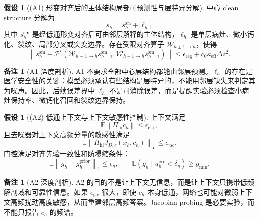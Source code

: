 \documentclass[11pt,a4paper,UTF8,fontset=fandol]{ctexart}
\theoremstyle{definition}
\newtheorem{assumption}[theorem]{假设}
\newtheorem{remark}[theorem]{备注}
\newcommand{\norm}[1]{\left\lVert#1\right\rVert}
\newcommand{\E}{\mathbb{E}}
\begin{document}
\begin{assumption}[(A1) 形变对齐后的主体结构局部可预测性与层特异分解]
中心 clean structure 分解为
\begin{equation}
    s_h=s_h^{\mathrm{sm}}+\ell_h,
\end{equation}
其中 $s_h^{\mathrm{sm}}$ 是经低通形变对齐后可由邻层解释的主体结构，$\ell_h$ 是单层病灶、微小钙化、裂纹、局部分叉或突变边界。存在受限对齐算子 $\mathcal W_{h\pm1\to h}$，使得
\begin{equation}
\label{eq:aligned-smooth-coreA}
    \left\|s_h^{\mathrm{sm}}-
    \mathcal P^\star\left(\mathcal W_{h-1\to h}s_{h-1}^{\mathrm{sm}},
    \mathcal W_{h+1\to h}s_{h+1}^{\mathrm{sm}}\right)\right\|
    \le \epsilon_{\mathrm{reg}}+c_0\kappa_{\mathrm{eff}}\Delta z^2.
\end{equation}
\end{assumption}

\begin{remark}[A1 深度剖析]
A1 不要求全部中心层结构都能由邻层预测。$\ell_h$ 的存在是医学安全性的关键：模型必须承认有些结构是层特异的，不能用邻层缺失来判定其为噪声。因此，后续误差界中 $\ell_h$ 不是可消除误差，而是提醒实验必须检查小病灶保持率、微钙化召回和裂纹边界保持。
\end{remark}

\begin{assumption}[(A2) 低通上下文与上下文敏感性控制]
上下文满足
\begin{equation}
\label{eq:ctx-bound-assumption-coreA}
    \E\norm{\Pi_{\mathrm{hi}}c_h}\le\epsilon_{\mathrm{ctx}},
\end{equation}
且去噪器对上下文高频分量的敏感性满足
\begin{equation}
\label{eq:ctx-jac-assumption-coreA}
    \E\norm{\Pi_{\mathrm{hi}}J_{D,c}(x_h,c_h)}_F\le\epsilon_{\mathrm{jac}}.
\end{equation}
门控满足对齐先验一致性和防塌缩条件：
\begin{equation}
\label{eq:gate-assumption-coreA}
    \E\norm{g_h-g_h^{\mathrm{prior}}}_1\le\epsilon_g,
    \qquad
    \E(g_h\mid u_h^{\mathrm{err}}<\delta_g)\ge g_{\min}.
\end{equation}
\end{assumption}

\begin{remark}[A2 深度剖析]
A2 的目的不是让上下文无信息，而是让上下文只携带低频解剖域和可靠性信息。如果 $\epsilon_{\mathrm{jac}}$ 很大，即使 $c_h$ 本身低通，网络也可能对微弱上下文高频扰动高度敏感，从而重建邻层高频答案。Jacobian probing 是必要实验，而不能只报告 $c_h$ 的频谱。
\end{remark}
\end{document}
